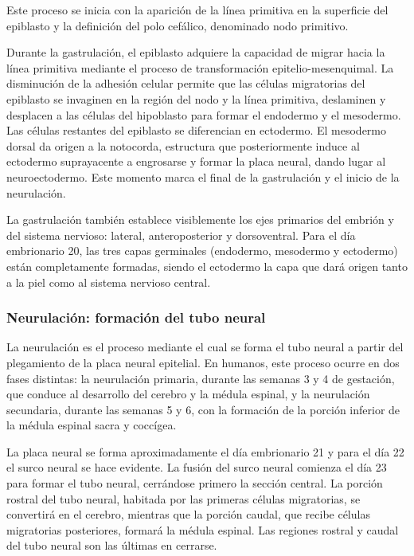 \documentclass[11pt,letterpaper]{report}
\begin{document}
Este proceso se inicia con la aparición de la línea primitiva en la superficie
del epiblasto y la definición del polo cefálico, denominado nodo primitivo.
\cite{MooreEmbryo4}

Durante la gastrulación, el epiblasto adquiere la capacidad de migrar hacia la
línea primitiva mediante el proceso de transformación epitelio-mesenquimal. La
disminución de la adhesión celular permite que las células migratorias del
epiblasto se invaginen en la región del nodo y la línea primitiva, deslaminen
y desplacen a las células del hipoblasto para formar el endodermo y el
mesodermo. Las células restantes del epiblasto se diferencian en ectodermo. El
mesodermo dorsal da origen a la notocorda, estructura que posteriormente induce
al ectodermo suprayacente a engrosarse y formar la placa neural, dando lugar al
neuroectodermo. Este momento marca el final de la gastrulación y el inicio de
la neurulación. \cite{Polin124}

La gastrulación también establece visiblemente los ejes primarios del embrión y
del sistema nervioso: lateral, anteroposterior y dorsoventral. Para el día
embrionario 20, las tres capas germinales (endodermo, mesodermo y ectodermo)
están completamente formadas, siendo el ectodermo la capa que dará origen tanto
a la piel como al sistema nervioso central. \cite{Polin124}

\subsubsection{Neurulación: formación del tubo neural}
La neurulación es el proceso mediante el cual se forma el tubo neural a partir
del plegamiento de la placa neural epitelial. En humanos, este proceso ocurre
en dos fases distintas: la neurulación primaria, durante las semanas 3 y 4 de
gestación, que conduce al desarrollo del cerebro y la médula espinal, y la
neurulación secundaria, durante las semanas 5 y 6, con la formación de la
porción inferior de la médula espinal sacra y coccígea. \cite{Polin124}

La placa neural se forma aproximadamente el día embrionario 21 y para el día 22
el surco neural se hace evidente. La fusión del surco neural comienza el día 23
para formar el tubo neural, cerrándose primero la sección central. La porción
rostral del tubo neural, habitada por las primeras células migratorias, se
convertirá en el cerebro, mientras que la porción caudal, que recibe células
migratorias posteriores, formará la médula espinal. Las regiones rostral y
caudal del tubo neural son las últimas en cerrarse. \cite{Gibb2018}
\end{document}
